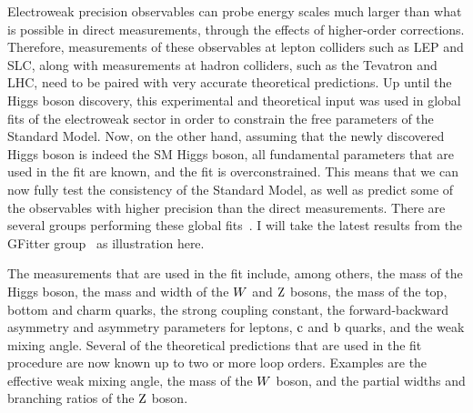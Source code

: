 Electroweak precision observables can probe energy scales much larger than what is possible in
direct measurements, through the effects of higher-order corrections. 
Therefore, measurements of these observables at lepton colliders such as LEP and SLC, along with
measurements at hadron colliders, such as the Tevatron and LHC, need to be paired with
very accurate theoretical predictions.
Up until the Higgs boson discovery, this experimental and theoretical input was used in global fits
of the electroweak sector in order to constrain the free parameters of the Standard Model.
Now, on the other hand, assuming that the newly discovered Higgs boson is indeed the SM Higgs boson,
all fundamental parameters that are used in the fit are known, and the fit is overconstrained. This
means that we can now fully test the consistency of the Standard Model, as well as predict some of
the observables with higher precision than the direct measurements. 
There are several groups performing these global
fits~\cite{CKMFitter,GFitter,ZFitter,LEPEWWG}. I will take the latest results from the GFitter
group~\cite{Baak:2014ora,Flacher:2008zq} as illustration here.

The measurements that are used in the fit include, among others, the mass of the Higgs boson, the
mass and width of the $W$ and $\mathrm{Z}$ bosons, the mass of the top, bottom and charm quarks, the
strong coupling constant, the forward-backward asymmetry and asymmetry parameters for leptons,
$\mathrm{c}$ and $\mathrm{b}$ quarks, and the weak mixing angle. 
Several of the theoretical predictions that are used in the fit procedure are now known up to two
or more loop orders. Examples are the effective weak mixing angle, the mass of the $W$ boson, and
the partial widths and branching ratios of the $\mathrm{Z}$ boson. 

